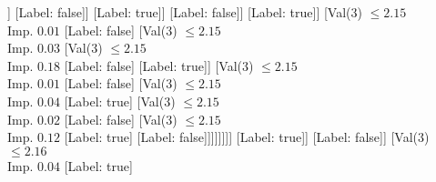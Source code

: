 \documentclass[margin=10pt]{standalone}
\begin{document}
\begin{forest}
																								[Val($3$) $ \leq 2.16$ \\ Imp. $0.01$
																									[Val($3$) $ \leq 2.15$ \\ Imp. $0.01$
																										[Val($3$) $ \leq 2.15$ \\ Imp. $0.02$
																											[Val($3$) $ \leq 2.15$ \\ Imp. $0.00$
																												[Val($3$) $ \leq 2.15$ \\ Imp. $0.07$
																													[Val($3$) $ \leq 2.15$ \\ Imp. $0.02$
																														[Val($3$) $ \leq 2.15$ \\ Imp. $0.13$
																															[Val($3$) $ \leq 2.15$ \\ Imp. $0.03$
																																[Val($3$) $ \leq 2.14$ \\ Imp. $0.38$
																																	[Label: false]
																																	[Label: true]]
																																[Label: false]]
																															[Label: true]]
																														[Label: false]]
																													[Label: true]]
																												[Val($3$) $ \leq 2.15$ \\ Imp. $0.01$
																													[Label: false]
																													[Val($3$) $ \leq 2.15$ \\ Imp. $0.03$
																														[Val($3$) $ \leq 2.15$ \\ Imp. $0.18$
																															[Label: false]
																															[Label: true]]
																														[Val($3$) $ \leq 2.15$ \\ Imp. $0.01$
																															[Label: false]
																															[Val($3$) $ \leq 2.15$ \\ Imp. $0.04$
																																[Label: true]
																																[Val($3$) $ \leq 2.15$ \\ Imp. $0.02$
																																	[Label: false]
																																	[Val($3$) $ \leq 2.15$ \\ Imp. $0.12$
																																		[Label: true]
																																		[Label: false]]]]]]]]
																											[Label: true]]
																										[Label: false]]
																									[Val($3$) $ \leq 2.16$ \\ Imp. $0.04$
																										[Label: true]

\end{forest}
\end{document}
